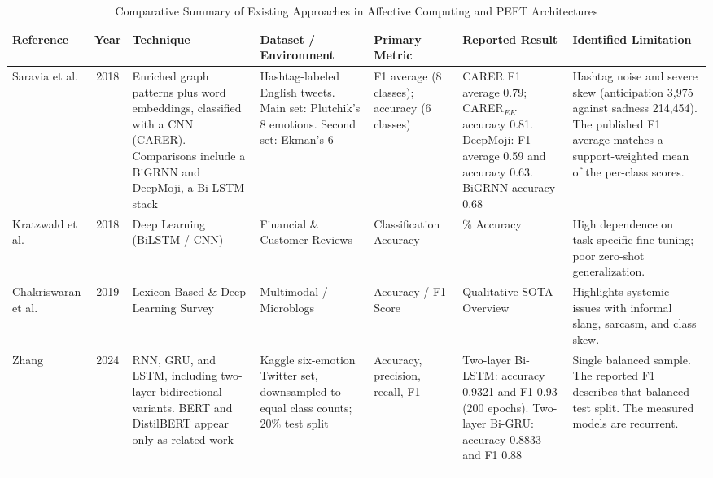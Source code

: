 \documentclass[conference]{IEEEtran}
\begin{document}
\begin{table}[t]
\centering
\caption{Comparative Summary of Existing Approaches in Affective Computing and PEFT Architectures}
\label{tab:literature_comparison}
\scriptsize
\setlength{\tabcolsep}{4pt} %
\begin{tabularx}{\textwidth}{@{} >{\hsize=0.85\hsize}X c >{\hsize=1.05\hsize}X >{\hsize=1.0\hsize}X >{\hsize=0.85\hsize}X >{\hsize=1.05\hsize}X >{\hsize=1.2\hsize}X @{}}
\toprule
\textbf{Reference} & \textbf{Year} & \textbf{Technique} & \textbf{Dataset / Environment} & \textbf{Primary Metric} & \textbf{Reported Result} & \textbf{Identified Limitation} \\
\midrule

Saravia et al. \cite{saravia2018carer} & 2018 & Enriched graph patterns plus word embeddings, classified with a CNN (CARER). Comparisons include a BiGRNN and DeepMoji, a Bi-LSTM stack & Hashtag-labeled English tweets. Main set: Plutchik's 8 emotions. Second set: Ekman's 6 & F1 average (8 classes); accuracy (6 classes) & CARER F1 average 0.79; CARER$_{EK}$ accuracy 0.81. DeepMoji: F1 average 0.59 and accuracy 0.63. BiGRNN accuracy 0.68 & Hashtag noise and severe skew (anticipation 3,975 against sadness 214,454). The published F1 average matches a support-weighted mean of the per-class scores. \\
\addlinespace

Kratzwald et al. \cite{kratzwald2018deep} & 2018 & Deep Learning (BiLSTM / CNN) & Financial \& Customer Reviews & Classification Accuracy & 82.4\% Accuracy & High dependence on task-specific fine-tuning; poor zero-shot generalization. \\
\addlinespace

Chakriswaran et al. \cite{chakriswaran2019emotion} & 2019 & Lexicon-Based \& Deep Learning Survey & Multimodal / Microblogs & Accuracy / F1-Score & Qualitative SOTA Overview & Highlights systemic issues with informal slang, sarcasm, and class skew. \\
\addlinespace

Zhang \cite{zhang2024comparative} & 2024 & RNN, GRU, and LSTM, including two-layer bidirectional variants. BERT and DistilBERT appear only as related work & Kaggle six-emotion Twitter set, downsampled to equal class counts; 20\% test split & Accuracy, precision, recall, F1 & Two-layer Bi-LSTM: accuracy 0.9321 and F1 0.93 (200 epochs). Two-layer Bi-GRU: accuracy 0.8833 and F1 0.88 & Single balanced sample. The reported F1 describes that balanced test split. The measured models are recurrent. \\
\addlinespace


\end{tabularx}
\end{table}
\end{document}
